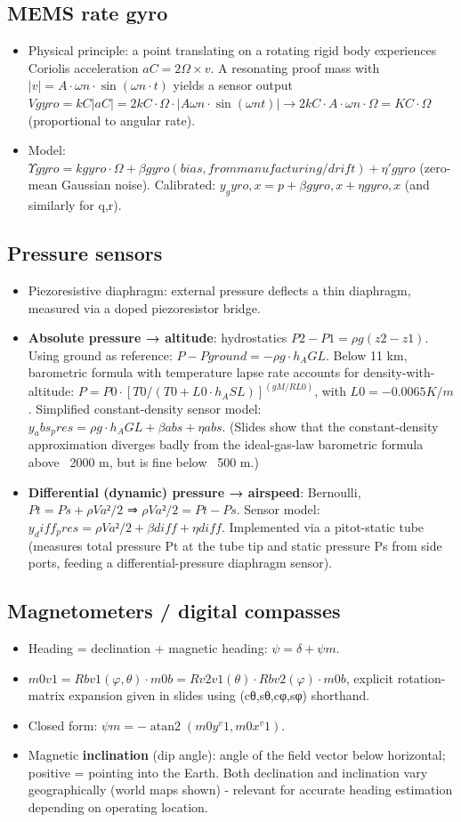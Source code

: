 \documentclass[11pt]{article}
\begin{document}
\subsection{MEMS rate gyro}
\begin{itemize}
\item Physical principle: a point translating on a rotating rigid body experiences Coriolis acceleration $aC = 2Ω×v$. A resonating proof mass with $|v| = A·ωn·\sin(ωn·t)$ yields a sensor output $Vgyro = kC|aC| = 2kC·Ω·|Aωn·\sin(ωnt)| → 2kC·A·ωn·Ω = KC·Ω$ (proportional to angular rate).
\item Model: $Υgyro = kgyro·Ω + βgyro (bias, from manufacturing/drift) + η'gyro$ (zero-mean Gaussian noise). Calibrated: $y_gyro,x = p + βgyro,x + ηgyro,x$ (and similarly for q,r).
\end{itemize}

\subsection{Pressure sensors}
\begin{itemize}
\item Piezoresistive diaphragm: external pressure deflects a thin diaphragm, measured via a doped piezoresistor bridge.
\item \textbf{Absolute pressure → altitude}: hydrostatics $P2-P1 = ρg(z2-z1)$. Using ground as reference: $P - Pground = -ρg·h_AGL$. Below 11 km, barometric formula with temperature lapse rate accounts for density-with-altitude: $P = P0·[T0/(T0+L0·h_ASL)]^(gM/RL0)$, with $L0 = -0.0065 K/m$. Simplified constant-density sensor model: $y_abs_pres = ρg·h_AGL + βabs + ηabs$. (Slides show that the constant-density approximation diverges badly from the ideal-gas-law barometric formula above ~2000 m, but is fine below ~500 m.)
\item \textbf{Differential (dynamic) pressure → airspeed}: Bernoulli, $Pt = Ps + ρVa²/2$ ⇒ $ρVa²/2 = Pt - Ps$. Sensor model: $y_diff_pres = ρVa²/2 + βdiff + ηdiff$. Implemented via a pitot-static tube (measures total pressure Pt at the tube tip and static pressure Ps from side ports, feeding a differential-pressure diaphragm sensor).
\end{itemize}

\subsection{Magnetometers / digital compasses}
\begin{itemize}
\item Heading = declination + magnetic heading: $ψ = δ + ψm$.
\item $m0v1 = Rbv1(φ,θ)·m0b = Rv2v1(θ)·Rbv2(φ)·m0b$, explicit rotation-matrix expansion given in slides using (cθ,sθ,cφ,sφ) shorthand.
\item Closed form: $ψm = -\operatorname{atan2}(m0y^v1, m0x^v1)$.
\item Magnetic \textbf{inclination} (dip angle): angle of the field vector below horizontal; positive = pointing into the Earth. Both declination and inclination vary geographically (world maps shown) - relevant for accurate heading estimation depending on operating location.
\end{itemize}
\end{document}
